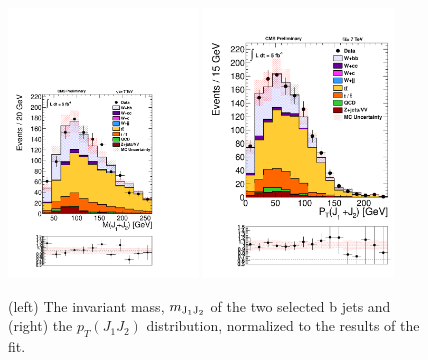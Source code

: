 \begin{figure}
\centering
\includegraphics[width=0.45\textwidth, trim = 0 4cm 0 0, clip=true ]{Wbb/fig7.pdf}
\includegraphics[width=0.45\textwidth, trim = 0 5cm 0 0, clip=true ]{Wbb/fig8.pdf}
\caption{(left) The invariant mass, $m_{\rm{J_{1} J_{2}}}$ of the two selected b jets and 
(right) the $p_{T}(J_{1} J_{2})$ distribution, normalized to the results of the fit.}
\label{figE}
\end{figure}

